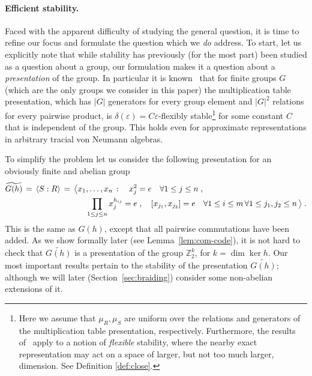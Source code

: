\documentclass[11pt]{article}
\theoremstyle{definition}
\newcommand{\Z}{\ensuremath{\mathbb{Z}}}
\newcommand{\eps}{\varepsilon}
\begin{document}
\paragraph{Efficient stability.}
Faced with the apparent difficulty of studying the general question, it is time to refine our focus and formulate the question which we \emph{do} address. To start, let us explicitly note that 
while stability has previously (for the most part) been studied as a question about a group, our formulation makes it a question about a \emph{presentation} of the group. In particular it is known~\cite{gowers2017inverse,de2019operator} that for finite groups $G$ (which are the only groups we consider in this paper) the multiplication table presentation, which has $|G|$ generators for every group element and $|G|^2$ relations for every pairwise product, is $\delta(\eps)=C\eps$-flexibly stable\footnote{Here we assume that $\mu_R,\mu_S$ are uniform over the relations and generators of the multiplication table presentation, respectively. Furthermore, the results of~\cite{gowers2017inverse,de2019operator} apply to a notion of \emph{flexible} stability, where the nearby exact representation may act on a space of larger, but not too much larger, dimension. See  Definition \ref{def:close}.} for some constant $C$ that is independent of the group. This holds even for approximate representations in arbitrary tracial von Neumann algebras. 

To simplify the problem let us consider the following presentation for an obviously finite and abelian group
\begin{align}
  \widetilde{G(h)} \,=\, \langle S:R\rangle \,=\, \big\langle &x_1,\ldots,x_n \,:\quad  x_j^2=e\quad \forall 1\leq j\leq n\;,\notag\\
 & \quad \prod_{1\leq j \leq n} x_j^{h_{ij}} = e\;,\quad [x_{j_1},x_{j_2}]=e\quad \forall 1\leq i\leq m\,\forall 1\leq j_1,j_2\leq n\,\big\rangle\;.\label{eq:wtgh-intro}
 \end{align}
This is the same as $G(h)$, except that all pairwise commutations have been added. As we show formally later (see Lemma~\ref{lem:com-code}), it is not hard to check that $\widetilde{G(h)}$ is a presentation of the group $\Z_2^k$, for $k=\dim\ker h$. Our most important results pertain to the stability of the presentation $\widetilde{G(h)}$; although we will later (Section~\ref{sec:braiding}) consider some non-abelian extensions of it. 

\newcommand{\wtG}{\widetilde{G(h)}}
\end{document}
